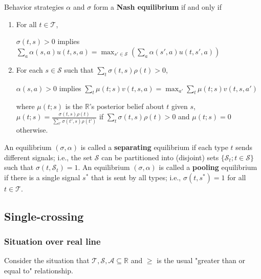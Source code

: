 \documentclass[11pt]{elegantbook}
\begin{document}
\begin{definition}
    \normalfont
    Behavior strategies $\alpha$ and $\sigma$ form a \textbf{Nash equilibrium} if and only if
    \begin{enumerate}
        \item For all $t\in \mathcal{T}$,
        \begin{center}
            $\sigma(t,s)>0$ implies $\sum_a \alpha(s,a)u(t,s,a) = \max_{s'\in \mathcal{S}}\left(\sum_a \alpha(s',a)u(t,s',a)\right)$
        \end{center}
        \item For each $s\in \mathcal{S}$ such that $\sum_{t}\sigma(t,s)\rho(t)>0$,
        \begin{center}
            $\alpha(s,a)>0$ implies $\sum_{t}\mu(t;s)v(t,s,a) = \max_{a'}\sum_{t}\mu(t;s)v(t,s,a')$
        \end{center}
        where $\mu(t;s)$ is the $\mathbb{R}$'s posterior belief about $t$ given $s$, $\mu(t;s)=\frac{\sigma(t,s)\rho(t)}{\sum_{t'}\sigma(t',s)\rho(t')}$ if $\sum_t\sigma(t,s)\rho(t)>0$ and $\mu(t;s)=0$ otherwise.
    \end{enumerate}
\end{definition}

\begin{definition}
    \normalfont
    An equilibrium $(\sigma,\alpha)$ is called a \textbf{separating} equilibrium if each type $t$ sends different signals; i.e., the set $\mathcal{S}$ can be partitioned into (disjoint) sets $\{\mathcal{S}_t; t\in \mathcal{S}\}$ such that $\sigma(t, \mathcal{S}_t) = 1$. An equilibrium $(\sigma,\alpha)$ is called a \textbf{pooling} equilibrium if there is a single signal $s^*$ that is sent by all types; i.e., $\sigma(t, s^*) = 1$ for all $t\in \mathcal{T}$.
\end{definition}


\subsection{Single-crossing}

\subsubsection{Situation over real line}
Consider the situation that $\mathcal{T},\mathcal{S},\mathcal{A}\subseteq \mathbb{R}$ and $\geq$ is the usual "greater than or equal to" relationship.
\end{document}
